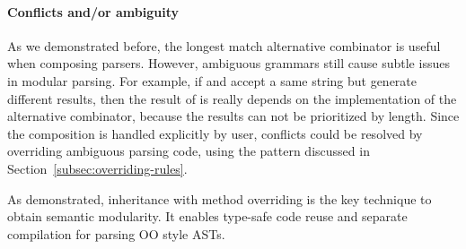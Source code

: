 \paragraph{Conflicts and/or ambiguity} As we demonstrated before, the longest match alternative combinator is useful when composing parsers. However, ambiguous grammars still cause subtle issues in modular parsing. For example, if  and  accept a same string but generate different results, then the result of  is really depends on the implementation of the alternative combinator, because the results can not be prioritized by length. Since the composition is handled explicitly by user, conflicts could be resolved by overriding ambiguous parsing code, using the pattern discussed in Section~\ref{subsec:overriding-rules}.

As demonstrated, inheritance with method overriding is the key
technique to obtain semantic modularity.  It enables type-safe code
reuse and separate compilation for parsing OO style ASTs.
